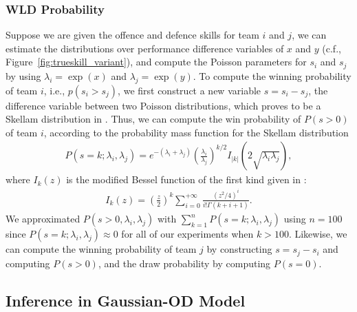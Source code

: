 \subsubsection{WLD Probability}
Suppose we are given the offence and defence skills for team $i$ and $j$, we can
estimate the distributions over performance difference variables of
$x$ and $y$ (c.f., Figure~\ref{fig:trueskill_variant}), and compute
the Poisson parameters for $s_i$ and $s_j$ by using $\lambda_i =
\exp(x)$ and $\lambda_j = \exp(y)$. To compute the winning probability
of team $i$, i.e., $p(s_i>s_j)$, we first construct a new variable $s
= s_i-s_j$, the difference variable between two Poisson distributions,
which proves to be a Skellam distribution in
\cite{Skellam46TheFrequencyDistribution}. Thus, we can compute the win
probability of $P(s>0)$ of team $i$, according to the probability mass
function for the Skellam distribution
\begin{align*}
     P(s=k; \lambda_i, \lambda_j) =e^{-(\lambda_i+\lambda_j)}\left(\frac{\lambda_i}{\lambda_j}\right)^{k/2}I_{|k|}\left(2\sqrt{\lambda_i\lambda_j}\right),
\end{align*}
where $I_{k}(z)$ is the modified Bessel function of the first kind given in \cite{Abramowitz74HandbookOfMathematical}:
\begin{align}
    I_k{(z)} = \left(\frac{z}{2}\right)^k\sum_{i=0}^{+\infty}\frac{(z^2/4)^i}{i!\Gamma(k+i+1)}.
\end{align}
We approximated $P(s>0,\lambda_i, \lambda_j)$ with
$\sum_{k=1}^{n} P(s=k; \lambda_i, \lambda_j)$ using $n=100$ since
$P(s=k; \lambda_i, \lambda_j) \approx 0$ for all of our experiments
when $k>100$. Likewise, we can compute the winning probability of team $j$ by constructing $s=s_j-s_i$ and computing $P(s>0)$, and the draw probability by computing $P(s=0)$. 

\subsection{Inference in Gaussian-OD Model}

